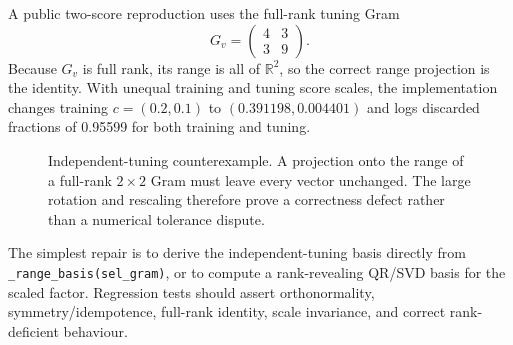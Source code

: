 \documentclass[10pt,a4paper]{article}
\newcommand{\code}[1]{\texttt{#1}}
\begin{document}
A public two-score reproduction uses the full-rank tuning Gram
\begin{equation}
  G_v=
  \begin{pmatrix}
    4 & 3\\
    3 & 9
  \end{pmatrix}.
  \label{eq:bug-gram}
\end{equation}
Because \(G_v\) is full rank, its range is all of \(\mathbb R^2\), so the
correct range projection is the identity. With unequal training and tuning
score scales, the implementation changes training \(c=(0.2,0.1)\) to
\((0.391198,0.004401)\) and logs discarded fractions of 0.95599 for both
training and tuning.

\begin{figure}[H]
\centering
{}
\caption{Independent-tuning counterexample. A projection onto the range of a
full-rank \(2\times2\) Gram must leave every vector unchanged. The large
rotation and rescaling therefore prove a correctness defect rather than a
numerical tolerance dispute.}
\label{fig:projection-bug}
\end{figure}

The simplest repair is to derive the independent-tuning basis directly from
\code{\_range\_basis(sel\_gram)}, or to compute a rank-revealing QR/SVD basis
for the scaled factor. Regression tests should assert orthonormality,
symmetry/idempotence, full-rank identity, scale invariance, and correct
rank-deficient behaviour.
\end{document}
